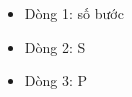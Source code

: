 \begin{itemize}
	\item     Dòng 1: số bước   
	\item     Dòng 2: S   
	\item     Dòng 3: P   
\end{itemize}